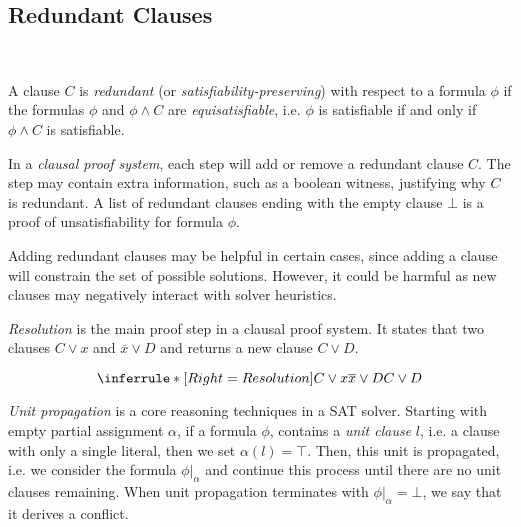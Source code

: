 \subsection{Redundant Clauses}~\label{subsec:redundant}

A clause $C$ is \emph{redundant} (or \emph{satisfiability-preserving}) with
respect to a formula $\phi$ if the formulas $\phi$ and $\phi \land C$ are
\emph{equisatisfiable}, i.e. $\phi$ is satisfiable if and only if $\phi \land C$
is satisfiable.

In a \emph{clausal proof system}, each step will add or remove a redundant
clause $C$. The step may contain extra information, such as a boolean witness,
justifying why $C$ is redundant. A list of redundant clauses ending with the
empty clause $\bot$ is a proof of unsatisfiability for formula $\phi$.


Adding redundant clauses may be helpful in certain cases, since adding a clause
will constrain the set of possible solutions. However, it could be harmful as
new clauses may negatively interact with solver heuristics.


\emph{Resolution} is the main proof step in a clausal proof system. It states that two clauses $C \lor x$ and $\overline{x} \lor D$ and returns a new clause $C \lor D$.

\begin{equation*}
    \inferrule*[Right=Resolution]{
        C \lor x \\ \overline{x} \lor D
    }{
        C \lor D
    }    
\end{equation*}

\emph{Unit propagation} is a core reasoning techniques in a SAT solver. Starting with empty partial assignment $\alpha$, if a formula $\phi$, contains a \emph{unit clause} $l$, i.e. a clause with only a single literal, then we set $\alpha(l) = \top$. Then, this unit is propagated, i.e. we consider the formula $\phi|_\alpha$ and continue this process until there are no unit clauses remaining. When unit propagation terminates with $\phi|_\alpha = \bot$, we say that it derives a conflict.

